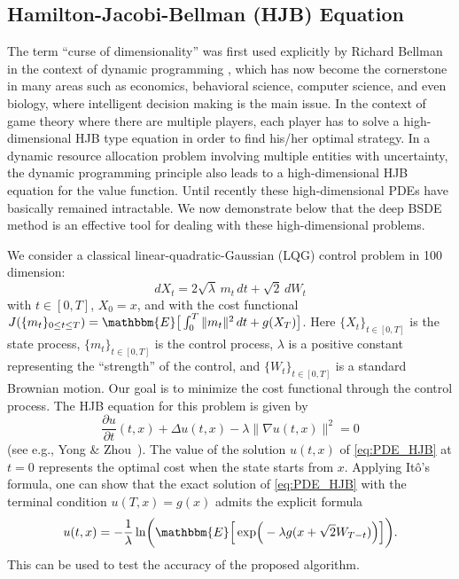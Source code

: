 \documentclass[11pt,english]{article}
\providecommand{\E}{{\ensuremath{\mathbbm{E}}}}
\begin{document}
\subsection*{Hamilton-Jacobi-Bellman (HJB) Equation}
The term ``curse of dimensionality'' was first used explicitly by
Richard Bellman in the context of dynamic programming \cite{Bellman1957}, which has now become
the cornerstone in many areas such as 
economics, behavioral science, computer science, and even biology, where
intelligent decision making is the main issue. 
In the context of game theory where there are multiple players, 
each player has to solve a high-dimensional HJB type equation
in order to find his/her optimal strategy. 
In a dynamic resource allocation problem involving multiple entities with uncertainty,
the dynamic programming principle also leads to a high-dimensional HJB
equation \cite{Powell2011}
for the value function.
Until recently these high-dimensional PDEs have basically remained intractable.
We now demonstrate below that the deep BSDE method is an effective
tool for dealing with these high-dimensional problems.

We consider a classical linear-quadratic-Gaussian (LQG) control problem in 100 dimension:
\begin{equation}
    dX_t = 2\sqrt{\lambda}\,m_t\,dt+\sqrt{2}\,dW_t
\end{equation}
with $ t \in [0,T] $, $ X_0 = x $, and with the cost functional
$ J( \{ m_t \}_{ 0 \leq t \leq T } ) = 
  \E\big[ 
    \int_0^T \|m_t\|^2 \, dt + g(X_T)
  \big]
$.
Here $ \{ X_t \}_{ t \in [0,T] } $ is the state process, 
$ \{ m_t \}_{ t \in [0,T] } $ 
is the control process, 
$ \lambda $ is a positive constant representing the ``strength'' of the control, and $ \{ W_t \}_{ t \in [0,T] } $ is a standard Brownian motion. 
Our goal is to minimize the cost functional through the control process. 
The HJB equation for this problem is given by
\begin{equation}
  \label{eq:PDE_HJB}
     \frac{ \partial u}{ \partial t } ( t, x )
  + \Delta u (t,x) - \lambda \|\nabla u(t,x) \|^2 = 0
\end{equation}
(see e.g., Yong \& Zhou~\cite[Chapter 4]{Yong1999}).
The value of the solution $ u(t,x) $ of \eqref{eq:PDE_HJB} at $t=0$ represents the optimal cost when the 
state starts from $x$. 
Applying It\^{o}'s formula, one can show that the exact solution of \eqref{eq:PDE_HJB}  with the terminal condition
$ u(T, x) = g(x) $ admits the explicit formula
\begin{equation}
\label{eq:HJB_formula}
  u(t,x) = - \frac{ 1}{ \lambda } 
  \ln\!\bigg( 
    \E\Big[ 
      \exp\!\Big( 
         - \lambda g( x + \sqrt{ 2 }W_{ T - t }  )
      \Big) 
    \Big] 
  \bigg).
\end{equation}
This can be used to test the accuracy of the proposed algorithm.
\end{document}
